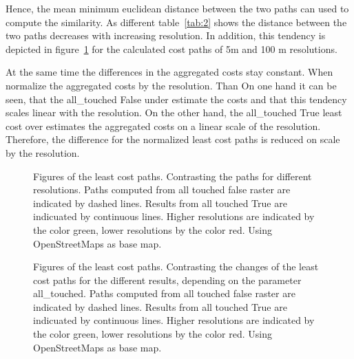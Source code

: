 \documentclass[acmtog]{acmart}
\begin{document}
	Hence, the mean minimum euclidean distance between the two paths can used to compute
	the similarity.
	As different table~\ref{tab:2} shows the distance between the two paths decreases
	with increasing resolution.
	In addition, this tendency is depicted in figure~\ref{fig:paths_resolution} for the calculated cost paths of 5m and 100 m resolutions.
	
	At the same time the differences in the aggregated costs stay constant.
	 When normalize the aggregated costs by the resolution.
	Than On one hand it can be seen, that the all\_touched False under estimate the costs and that this tendency scales
	linear with the resolution.
	On the other hand, the all\_touched True least cost over estimates the aggregated costs on a linear scale of
	the resolution.
	Therefore, the difference for the normalized least cost paths is reduced on scale by the resolution.
	
	\begin{figure}
		\centering
		
		\qquad
		\caption{Figures of the least cost paths. Contrasting the paths for different resolutions. Paths computed from all touched false raster are indicated by dashed lines. Results from all touched True are indicuated by continuous lines. Higher resolutions are indicated by the color green, lower resolutions by the color red. Using OpenStreetMaps as base map.}
		\label{fig:paths_resolution}
	\end{figure}

	\begin{figure}
	\centering
	
	\qquad

	\caption{Figures of the least cost paths. Contrasting the changes of the least cost paths for the different results, depending on the parameter all\_touched. Paths computed from all touched false raster are indicated by dashed lines. Results from all touched True are indicuated by continuous lines. Higher resolutions are indicated by the color green, lower resolutions by the color red. Using OpenStreetMaps as base map.}
	\label{fig:paths_alltouched}
\end{figure}
	
\end{document}
